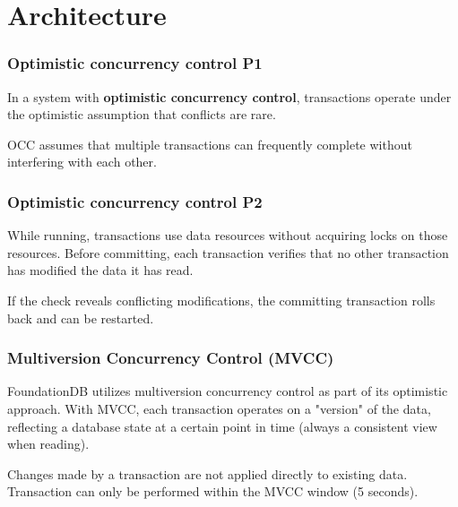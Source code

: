 \section{Architecture}

\begin{frame}
	\frametitle{Optimistic concurrency control P1}
 In a system with \textbf{optimistic concurrency control}, transactions operate under the optimistic assumption that conflicts are rare. 
\vspace{0.5cm}

 OCC assumes that multiple transactions can frequently complete without interfering with each other.
\end{frame}

\begin{frame}
	\frametitle{Optimistic concurrency control P2}
While running, transactions use data resources without acquiring locks on those resources. Before committing, each transaction verifies that no other transaction has modified the data it has read. 
\vspace{0.5cm}

If the check reveals conflicting modifications, the committing transaction rolls back and can be restarted.
\end{frame}

\begin{frame}
	\frametitle{Multiversion Concurrency Control (MVCC)}
  FoundationDB utilizes multiversion concurrency control as part of its optimistic approach. With MVCC, each transaction operates on a "version" of the data, reflecting a database state at a certain point in time (always a consistent view when reading).
  \vspace{0.5cm}
  
  Changes made by a transaction are not applied directly to existing data.
  Transaction can only be performed within the MVCC window (5 seconds).
\end{frame}



